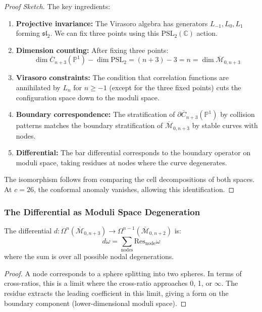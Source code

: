 \begin{proof}[Proof Sketch]
The key ingredients:
\begin{enumerate}
\item \textbf{Projective invariance:} The Virasoro algebra has generators $L_{-1}, L_0, L_1$ forming 
$\mathfrak{sl}_2$. We can fix three points using this $\text{PSL}_2(\mathbb{C})$ action.
 
\item \textbf{Dimension counting:} After fixing three points:
\[
\dim \overline{C}_{n+3}(\mathbb{P}^1) - \dim \text{PSL}_2 = (n+3) - 3 = n = \dim \overline{\mathcal{M}}_{0,n+3}
\]
 
\item \textbf{Virasoro constraints:} The condition that correlation functions are annihilated by $L_n$ 
for $n \geq -1$ (except for the three fixed points) cuts the configuration space down to the moduli space.
 
\item \textbf{Boundary correspondence:} The stratification of $\partial\overline{C}_{n+3}(\mathbb{P}^1)$ by 
collision patterns matches the boundary stratification of $\overline{\mathcal{M}}_{0,n+3}$ by stable curves 
with nodes.
 
\item \textbf{Differential:} The bar differential corresponds to the boundary operator on moduli space, 
taking residues at nodes where the curve degenerates.
\end{enumerate}
 
The isomorphism follows from comparing the cell decompositions of both spaces. At $c = 26$, the 
conformal anomaly vanishes, allowing this identification.
\end{proof}
 
\subsubsection{The Differential as Moduli Space Degeneration}
 
\begin{proposition}
The differential $d: \Omega^n(\overline{\mathcal{M}}_{0,n+3}) \to \Omega^{n-1}(\overline{\mathcal{M}}_{0,n+2})$ is:
\[
d\omega = \sum_{\text{nodes}} \text{Res}_{\text{node}} \omega
\]
where the sum is over all possible nodal degenerations.
\end{proposition}
 
\begin{proof}
A node corresponds to a sphere splitting into two spheres. In terms of cross-ratios, this is a limit 
where the cross-ratio approaches 0, 1, or $\infty$. The residue extracts the leading coefficient in this 
limit, giving a form on the boundary component (lower-dimensional moduli space).
\end{proof}
 

